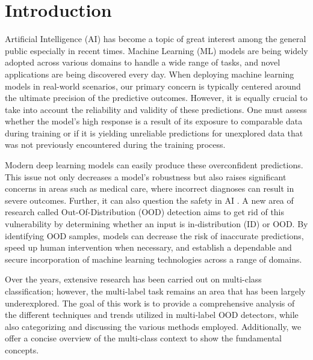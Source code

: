 \section{Introduction}

Artificial Intelligence (AI) has become a topic of great interest among the general public especially in recent times. 
Machine Learning (ML) models are being widely adopted across various domains to handle a wide range of tasks, 
and novel applications are being discovered every day. When deploying machine learning models in real-world scenarios, 
our primary concern is typically centered around the ultimate precision of the predictive outcomes. 
However, it is equally crucial to take into account the reliability and validity of these predictions. 
One must assess whether the model's high response is a result of its exposure to comparable data during training or if it is yielding 
unreliable predictions for unexplored data that was not previously encountered during the training process.

Modern deep learning models can easily produce these overconfident predictions. 
This issue not only decreases a model's robustness but also raises significant concerns in areas such as medical care, where incorrect diagnoses can result in severe outcomes. 
Further, it can also question the safety in AI \cite{Amodei2016}.
A new area of research called Out-Of-Distribution (OOD) detection aims to get rid of this vulnerability by determining whether an input is in-distribution (ID) or OOD. \cite{Hendrycks2016} \cite{Wang2021} \cite{Mohseni2021} \cite{Zolfi2022} \cite{Yang2021} \cite{Huang2021}
By identifying OOD samples, models can decrease the risk of inaccurate predictions, speed up human intervention when necessary, and establish a dependable and secure incorporation of machine learning technologies across a range of domains.

Over the years, extensive research has been carried out on multi-class classification; 
however, the multi-label task remains an area that has been largely underexplored. 
The goal of this work is to provide a comprehensive analysis of the different techniques and trends utilized in multi-label OOD detectors, while also categorizing and discussing the various methods employed. Additionally, we offer a concise overview of the multi-class context to show the fundamental concepts. 







